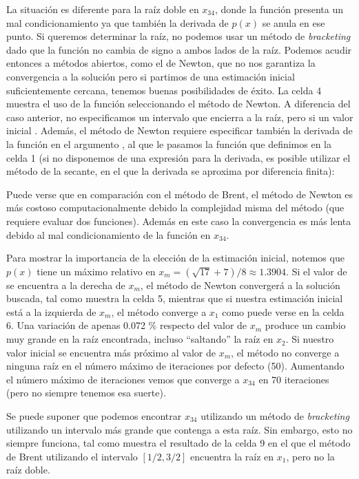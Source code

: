 La situación es diferente para la raíz doble en $x_{34}$, donde la función presenta un mal condicionamiento ya que también la derivada de $p(x)$ se anula en ese punto. Si queremos determinar la raíz, no podemos usar un método de \textit{bracketing} dado que la función no cambia de signo a ambos lados de la raíz. Podemos acudir entonces a métodos abiertos, como el de Newton, que no nos garantiza la convergencia a la solución pero si partimos de una estimación inicial suficientemente cercana, tenemos buenas posibilidades de éxito. La celda 4 muestra el uso de la función  seleccionando el método de Newton. A diferencia del caso anterior, no especificamos un intervalo que encierra a la raíz, pero si un valor inicial . Además, el método de Newton requiere especificar también la derivada de la función en el argumento , al que le pasamos la función  que definimos en la celda 1 (si no disponemos de una expresión para la derivada, es posible utilizar el método de la secante, en el que la derivada se aproxima por diferencia finita):

Puede verse que en comparación con el método de Brent, el método de Newton es más costoso computacionalmente debido la complejidad misma del método (que requiere evaluar dos funciones). Además en este caso la convergencia es más lenta debido al mal condicionamiento de la función en $x_{34}$. 

Para mostrar la importancia de la elección de la estimación inicial, notemos que $p(x)$ tiene un máximo relativo en $x_m = (\sqrt{17} + 7)/8 \approx 1.3904$. Si el valor de  se encuentra a la derecha de $x_m$, el método de Newton convergerá a la solución buscada, tal como muestra la celda 5, mientras que si nuestra estimación inicial está a la izquierda de $x_m$, el método converge a $x_1$ como puede verse en la celda 6. Una variación de apenas 0.072 \% respecto del valor de $x_m$ produce un cambio muy grande en la raíz encontrada, incluso ``saltando'' la raíz en $x_2$. Si nuestro valor inicial se encuentra más próximo al valor de $x_m$, el método no converge a ninguna raíz en el número máximo de iteraciones por defecto (50). Aumentando el número máximo de iteraciones vemos que converge a $x_{34}$ en 70 iteraciones (pero no siempre tenemos esa suerte).

Se puede suponer que podemos encontrar $x_{34}$ utilizando un método de \textit{bracketing} utilizando un intervalo más grande que contenga a esta raíz. Sin embargo, esto no siempre funciona, tal como muestra el resultado de la celda 9 en el que el método de Brent utilizando el intervalo $[1/2, 3/2]$ encuentra la raíz en $x_1$, pero no la raíz doble.

